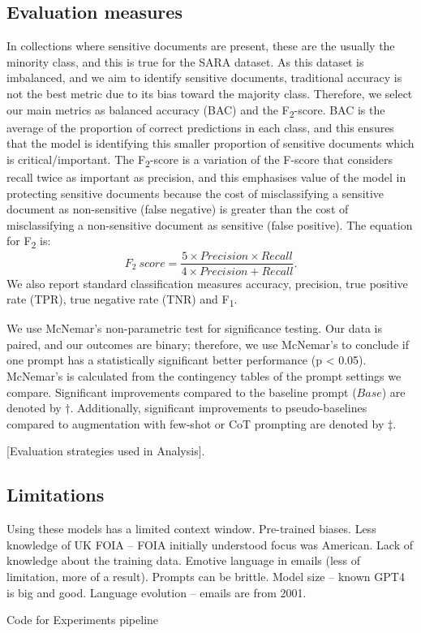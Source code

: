 \subsection{Evaluation measures}
In collections where sensitive documents are present, these are the usually the minority class, and this is true for the SARA dataset. As this dataset is imbalanced, and we aim to identify sensitive documents, traditional accuracy is not the best metric due to its bias toward the majority class. Therefore, we select our main metrics as balanced accuracy (BAC) and the F\textsubscript{2}-score. BAC is the average of the proportion of correct predictions in each class, and this ensures that the model is identifying this smaller proportion of sensitive documents which is critical/important. The F\textsubscript{2}-score is a variation of the F-score that considers recall twice as important as precision, and this emphasises value of the model in protecting sensitive documents because the cost of misclassifying a sensitive document as non-sensitive (false negative) is greater than the cost of misclassifying a non-sensitive document as sensitive (false positive). The equation for F\textsubscript{2} is:
\begin{equation*}
F_2\ score = \frac{5 \times Precision \times Recall}{4 \times Precision + Recall} .
\end{equation*}
We also report standard classification measures accuracy, precision, true positive rate (TPR), true negative rate (TNR) and F\textsubscript{1}.

We use McNemar’s non-parametric test \cite{mcnemar1947note} for significance testing. Our data is paired, and our outcomes are binary; therefore, we use McNemar’s to conclude if one prompt has a statistically significant better performance (p < 0.05). McNemar’s is calculated from the contingency tables of the prompt settings we compare. Significant improvements compared to the baseline prompt ($Base$) are denoted by $\dagger$. Additionally, significant improvements to pseudo-baselines compared to augmentation with few-shot or CoT prompting are denoted by $\ddagger$.

[Evaluation strategies used in Analysis].

\subsection{Limitations}
Using these models has a limited context window.
Pre-trained biases.
Less knowledge of UK FOIA – FOIA initially understood focus was American.
Lack of knowledge about the training data.
Emotive language in emails (less of limitation, more of a result).
Prompts can be brittle.
Model size – known GPT4 is big and good.
Language evolution – emails are from 2001.


Code for Experiments 
pipeline

